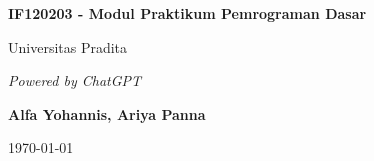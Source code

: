 \documentclass{book}
\begin{document}
		
	\begin{titlepage}
		\centering
		\vspace*{1cm}
		
		\Huge
		\textbf{IF120203 - Modul Praktikum Pemrograman Dasar}
		
		\vspace{0.5cm}
		
		\LARGE
		Universitas Pradita
		
		\vspace{1.5cm}
		
		\textit{Powered by ChatGPT}
		
		\vspace{2cm}
		
		\textbf{Alfa Yohannis, Ariya Panna}
		
		\vspace{0.8cm}
		
		\today
		
		\vfill
	\end{titlepage}
	
	\tableofcontents

	
	
		
\end{document}
